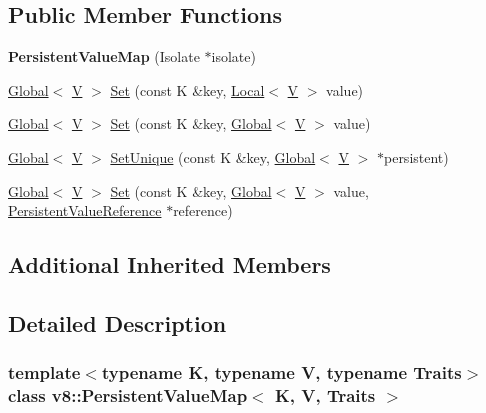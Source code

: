 \subsection*{Public Member Functions}
\begin{DoxyCompactItemize}
\item 
\mbox{\label{classv8_1_1PersistentValueMap_af8000a75ef84fa719724dc4dadc1e5ee}} 
{\bfseries Persistent\+Value\+Map} (Isolate $\ast$isolate)
\item 
\mbox{\hyperlink{classv8_1_1Global}{Global}}$<$ \mbox{\hyperlink{classV}{V}} $>$ \mbox{\hyperlink{classv8_1_1PersistentValueMap_a4527a2e1b25a9f1772317f948382d9f9}{Set}} (const K \&key, \mbox{\hyperlink{classv8_1_1Local}{Local}}$<$ \mbox{\hyperlink{classV}{V}} $>$ value)
\item 
\mbox{\hyperlink{classv8_1_1Global}{Global}}$<$ \mbox{\hyperlink{classV}{V}} $>$ \mbox{\hyperlink{classv8_1_1PersistentValueMap_a00f89f1b7665698349f98b04d0059180}{Set}} (const K \&key, \mbox{\hyperlink{classv8_1_1Global}{Global}}$<$ \mbox{\hyperlink{classV}{V}} $>$ value)
\item 
\mbox{\hyperlink{classv8_1_1Global}{Global}}$<$ \mbox{\hyperlink{classV}{V}} $>$ \mbox{\hyperlink{classv8_1_1PersistentValueMap_a97ab74c7670e65dd5f95ec2940c4ab11}{Set\+Unique}} (const K \&key, \mbox{\hyperlink{classv8_1_1Global}{Global}}$<$ \mbox{\hyperlink{classV}{V}} $>$ $\ast$persistent)
\item 
\mbox{\hyperlink{classv8_1_1Global}{Global}}$<$ \mbox{\hyperlink{classV}{V}} $>$ \mbox{\hyperlink{classv8_1_1PersistentValueMap_a8128f8cff6ed0f3177e966b28cc081ba}{Set}} (const K \&key, \mbox{\hyperlink{classv8_1_1Global}{Global}}$<$ \mbox{\hyperlink{classV}{V}} $>$ value, \mbox{\hyperlink{classv8_1_1PersistentValueMapBase_1_1PersistentValueReference}{Persistent\+Value\+Reference}} $\ast$reference)
\end{DoxyCompactItemize}
\subsection*{Additional Inherited Members}


\subsection{Detailed Description}
\subsubsection*{template$<$typename K, typename V, typename Traits$>$\newline
class v8\+::\+Persistent\+Value\+Map$<$ K, V, Traits $>$}



